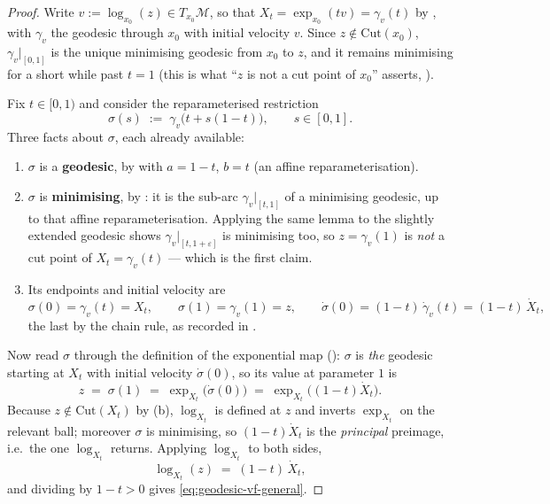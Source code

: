 \documentclass[11pt,a4paper]{report}
\theoremstyle{definition}
\theoremstyle{remark}
\newcommand{\eps}{\varepsilon}
\begin{document}
\begin{proof}
Write $v:=\log_{x_0}(z)\in T_{x_0}\mathcal M$, so that
$X_t=\exp_{x_0}(tv)=\gamma_v(t)$ by , with
$\gamma_v$ the geodesic through $x_0$ with initial velocity $v$. Since
$z\notin\mathrm{Cut}(x_0)$, $\gamma_v|_{[0,1]}$ is the unique minimising
geodesic from $x_0$ to $z$, and it remains minimising for a short while past
$t=1$ (this is what ``$z$ is not a cut point of $x_0$'' asserts,
).

Fix $t\in[0,1)$ and consider the reparameterised restriction
\[
\sigma(s) \;:=\; \gamma_v\bigl(t+s(1-t)\bigr),
\qquad s\in[0,1] .
\]
Three facts about $\sigma$, each already available:
\begin{enumerate}[nosep,label=(\alph*)]
\item $\sigma$ is a \textbf{geodesic}, by  with
      $a=1-t$, $b=t$ (an affine reparameterisation).
\item $\sigma$ is \textbf{minimising}, by : it
      is the sub-arc $\gamma_v|_{[t,1]}$ of a minimising geodesic, up to
      that affine reparameterisation. Applying the same lemma to the
      slightly extended geodesic shows $\gamma_v|_{[t,1+\eps]}$ is
      minimising too, so $z=\gamma_v(1)$ is \emph{not} a cut point of
      $X_t=\gamma_v(t)$ --- which is the first claim.
\item Its endpoints and initial velocity are
      \[
      \sigma(0)=\gamma_v(t)=X_t ,
      \qquad
      \sigma(1)=\gamma_v(1)=z ,
      \qquad
      \dot\sigma(0)=(1-t)\,\dot\gamma_v(t)=(1-t)\,\dot X_t ,
      \]
      the last by the chain rule, as recorded in
      .
\end{enumerate}

Now read $\sigma$ through the definition of the exponential map
(): $\sigma$ is \emph{the} geodesic starting at
$X_t$ with initial velocity $\dot\sigma(0)$, so its value at parameter $1$ is
\[
z \;=\; \sigma(1) \;=\; \exp_{X_t}\bigl(\dot\sigma(0)\bigr) \;=\; \exp_{X_t}\bigl((1-t)\dot X_t\bigr) .
\]
Because $z\notin\mathrm{Cut}(X_t)$ by (b), $\log_{X_t}$ is defined at $z$
and inverts $\exp_{X_t}$ on the relevant ball; moreover $\sigma$ is
minimising, so $(1-t)\dot X_t$ is the \emph{principal} preimage, i.e.\ the
one $\log_{X_t}$ returns. Applying $\log_{X_t}$ to both sides,
\[
\log_{X_t}(z) \;=\; (1-t)\,\dot X_t ,
\]
and dividing by $1-t>0$ gives \eqref{eq:geodesic-vf-general}.
\end{proof}
\end{document}
